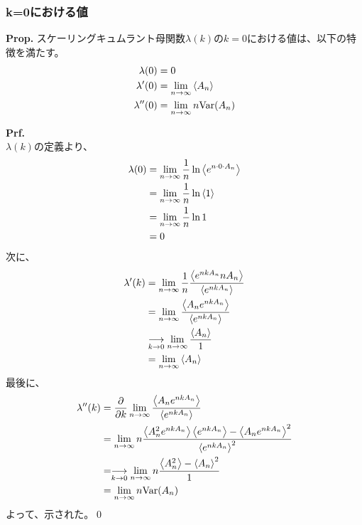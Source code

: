 \documentclass[a4paper,11pt]{jsarticle}
\numberwithin{equation}{section}
\begin{document}
\subsubsection{k=0における値}
\begin{itembox}[l]{\textbf{Prop.}}
    スケーリングキュムラント母関数$\lambda(k)$の$k=0$における値は、以下の特徴を満たす。
    \begin{align}
        \lambda(0) &= 0\\
        \lambda'(0) &= \lim _{n \to \infty} \ev{A_n} \\
        \lambda''(0) &= \lim _{n \to \infty} n \text{Var}(A_n)
    \end{align}

\end{itembox}
\textbf{Prf.}\\
$\lambda(k)$の定義より、
\begin{align}
    \lambda(0) &= \lim_{n \to \infty} \frac{1}{n} \ln \ev{e^{n \cdot 0 \cdot A_n}}\\
    &= \lim_{n \to \infty} \frac{1}{n} \ln \ev{1}\\
    &= \lim_{n \to \infty} \frac{1}{n} \ln 1\\
    &= 0
\end{align}
次に、
\begin{align}
    \lambda'(k) &= \lim_{n \to \infty} \frac{1}{n} \frac{\ev{e^{nkA_n} nA_n}}{\ev{e^{nkA_n}}}\\
    &= \lim_{n \to \infty} \frac{\ev{A_n e^{nkA_n}}}{\ev{e^{nkA_n}}}\\
    &\underset{k\to 0}{\longrightarrow} \lim_{n \to \infty} \frac{\ev{A_n}}{1}\\
    &= \lim_{n \to \infty} \ev{A_n}
\end{align}
最後に、
\begin{align}
    \lambda''(k) &= \pdv{k} \lim_{n \to \infty} \frac{\ev{A_n e^{nkA_n}}}{\ev{e^{nkA_n}}}\\
    &= \lim_{n \to \infty} n \frac{\ev{A_n^2 e^{nkA_n}}\ev{e^{nkA_n}}-\ev{A_n e^{nkA_n}}^2}{\ev{e^{nkA_n}}^2}\\
    &= \underset{k\to 0}{\longrightarrow} \lim_{n \to \infty} n \frac{\ev{A_n^2} - \ev{A_n}^2}{1}\\
    &= \lim_{n \to \infty}n \text{Var}(A_n)
\end{align}
よって、示された。\qed
\end{document}
